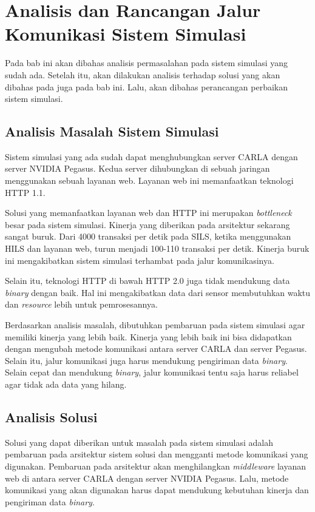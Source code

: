 \chapter{Analisis dan Rancangan Jalur Komunikasi Sistem Simulasi}

Pada bab ini akan dibahas analisis permasalahan pada sistem simulasi yang sudah
ada. Setelah itu, akan dilakukan analisis terhadap solusi yang akan dibahas pada
juga pada bab ini. Lalu, akan dibahas perancangan perbaikan sistem simulasi.

\section{Analisis Masalah Sistem Simulasi}

Sistem simulasi yang ada sudah dapat menghubungkan server CARLA dengan server
NVIDIA Pegasus. Kedua server dihubungkan di sebuah jaringan menggunakan sebuah
layanan web. Layanan web ini memanfaatkan teknologi HTTP 1.1.

Solusi yang memanfaatkan layanan web dan HTTP ini merupakan \textit{bottleneck}
besar pada sistem simulasi. Kinerja yang diberikan pada arsitektur sekarang
sangat buruk. Dari 4000 transaksi per detik pada SILS, ketika menggunakan HILS
dan layanan web, turun menjadi 100-110 transaksi per detik. Kinerja buruk ini
mengakibatkan sistem simulasi terhambat pada jalur komunikasinya.

Selain itu, teknologi HTTP di bawah HTTP 2.0 juga tidak mendukung data
\textit{binary} dengan baik. Hal ini mengakibatkan data dari sensor membutuhkan
waktu dan \textit{resource} lebih untuk pemrosesannya.

Berdasarkan analisis masalah, dibutuhkan pembaruan pada sistem simulasi agar
memiliki kinerja yang lebih baik. Kinerja yang lebih baik ini bisa didapatkan
dengan mengubah metode komunikasi antara server CARLA dan server Pegasus. Selain
itu, jalur komunikasi juga harus mendukung pengiriman data \textit{binary}.
Selain cepat dan mendukung \textit{binary}, jalur komunikasi tentu saja harus
reliabel agar tidak ada data yang hilang.

\section{Analisis Solusi}

Solusi yang dapat diberikan untuk masalah pada sistem simulasi adalah pembaruan
pada arsitektur sistem solusi dan mengganti metode komunikasi yang digunakan.
Pembaruan pada arsitektur akan menghilangkan \textit{middleware} layanan web di
antara server CARLA dengan server NVIDIA Pegasus. Lalu, metode komunikasi yang
akan digunakan harus dapat mendukung kebutuhan kinerja dan pengiriman data
\textit{binary}.

